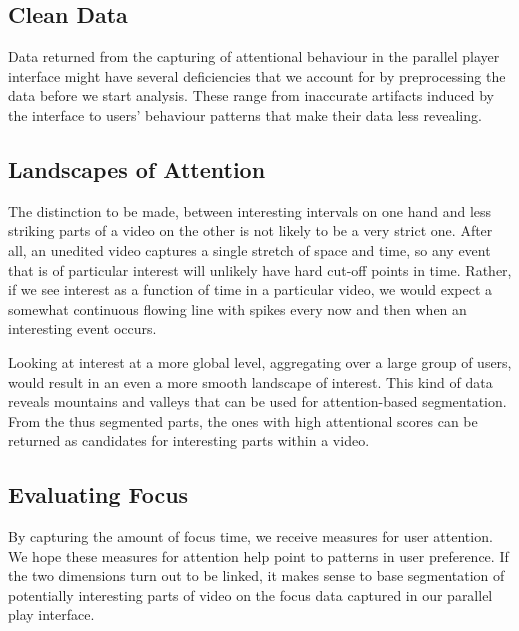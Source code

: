 \subsection{Clean Data} %
\label{sub:clean_data}

Data returned from the capturing of attentional behaviour in the parallel player interface might have several deficiencies that we account for by preprocessing the data before we start analysis. These range from inaccurate artifacts induced by the interface to users' behaviour patterns that make their data less revealing.



\subsection{Landscapes of Attention} %
\label{sub:landscapes_of_attention}

The distinction to be made, between interesting intervals on one hand and less striking parts of a video on the other is not likely to be a very strict one. After all, an unedited video captures a single stretch of space and time, so any event that is of particular interest will unlikely have hard cut-off points in time. Rather, if we see interest as a function of time in a particular video, we would expect a somewhat continuous flowing line with spikes every now and then when an interesting event occurs. 

Looking at interest at a more global level, aggregating over a large group of users, would result in an even a more smooth landscape of interest. This kind of data reveals mountains and valleys that can be used for attention-based segmentation. From the thus segmented parts, the ones with high attentional scores can be returned as candidates for interesting parts within a video.


\subsection{Evaluating Focus} %
\label{sub:evaluating_focus}

By capturing the amount of focus time, we receive measures for user attention. We hope these measures for attention help point to patterns in user preference. If the two dimensions turn out to be linked, it makes sense to base segmentation of potentially interesting parts of video on the focus data captured in our parallel play interface.


